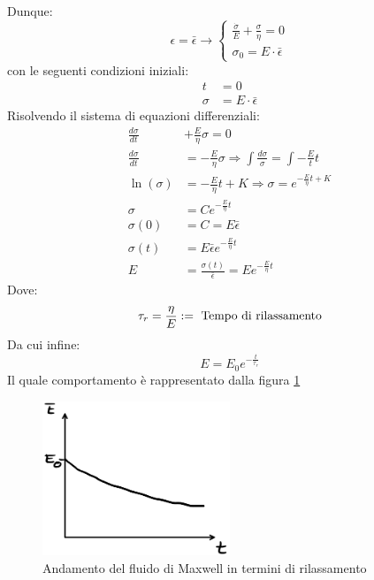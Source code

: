 Dunque:
\begin{equation}
\epsilon = \bar{\epsilon} \rightarrow%
\begin{cases}
\frac{\dot{\sigma}}{E}+\frac{\sigma}{\eta} = 0\\
\sigma_0 = E \cdot \bar{\epsilon}
\end{cases}
\end{equation}
con le seguenti condizioni iniziali:
\begin{equation}
\begin{split}
t&=0\\
\sigma &= E \cdot \bar{\epsilon}
\end{split}
\end{equation}
Risolvendo il sistema di equazioni differenziali:
\begin{equation}
\begin{split}
\frac{d\sigma}{dt} &+ \frac{E}{\eta} \sigma = 0\\
\frac{d\sigma}{dt} &= -\frac{E}{\eta} \sigma \Rightarrow \int{\frac{d\sigma}{\sigma}} = \int{-\frac{E}{t}t}\\
\ln(\sigma)&= -\frac{E}{\eta}t + K \Rightarrow \sigma = e^{-\frac{E}{\eta}t+K}\\
\sigma &= C e^{-\frac{E}{\eta}t}\\
\sigma(0) &= C = E\bar{\epsilon}\\
\sigma(t) &= E\bar{\epsilon}e^{-\frac{E}{\eta}t}\\
E&= \frac{\sigma(t)}{\bar{\epsilon}}=Ee^{-\frac{E}{\eta}t}
\end{split}
\end{equation}
Dove:
\begin{equation}
\tau_r = \frac{\eta}{E} := \textup{ Tempo di rilassamento}
\end{equation}
Da cui infine:
\begin{equation}
E=E_0 e^{-\frac{t}{\tau_r}}
\end{equation}
Il quale comportamento è rappresentato dalla figura \ref{fig:RilassamentoMaxwell}
\begin{figure}
\centering
\includegraphics[width = 0.5\textwidth]{gfx/RilassamentoMaxwell}
\caption{Andamento del fluido di Maxwell in termini di rilassamento}
\label{fig:RilassamentoMaxwell}
\end{figure}

